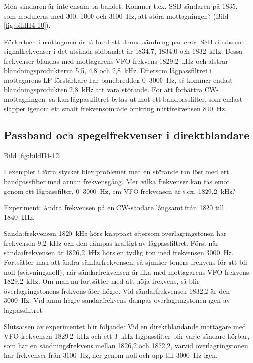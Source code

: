 Men sändaren är inte ensam på bandet. Kommer t.ex. SSB-sändaren på
1835, som moduleras med 300, 1000 och 3000~Hz, att störa mottagningen?
(Bild \ref{fig:bildII4-10}).

Förkretsen i mottagaren är så bred att denna sändning
passerar. SSB-sändarens signalfrekvenser i det utsända sidbandet är
1834,7, 1834,0 och 1832~kHz. Dessa frekvenser blandas med mottagarens
VFO-frekvens 1829,2~kHz och alstrar blandningsprodukterna 5,5, 4,8 och
2,8~kHz. Eftersom lågpassfiltret i mottagarens LF-förstärkare har
bandbredden 0--3000~Hz, så kommer endast blandningsprodukten 2,8~kHz
att vara störande. För att förbättra CW-mottagningen, så kan
lågpassfiltret bytas ut mot ett bandpassfilter, som endast släpper
igenom ett smalt frekvensområde omkring mittfrekvensen 800~Hz.

\subsection{Passband och spegelfrekvenser i direktblandare}

Bild \ref{fig:bildII4-12}

I exemplet i förra stycket blev problemet med en störande ton löst med
ett bandpassfilter med annan frekvensgång.  Men vilka frekvenser kan
tas emot genom ett lågpassfilter, 0--3000~Hz, om VFO-frekvensen är
t.ex. 1829,2~kHz?


Experiment: Ändra frekvensen på en CW-sändare långsamt från 1820 till
1840~kHz.

Sändarfrekvensen 1820~kHz hörs knappast eftersom överlagringstonen har
frekvensen 9,2~kHz och den dämpas kraftigt av lågpassfiltret. Först
när sändarfrekvensen är 1826,2~kHz hörs en tydlig ton med frekvensen
3000~Hz. Fortsätter man att ändra sändarfrekvensen, så sjunker tonens
frekvens för att bli noll (svävningsnoll), när sändarfrekvensen är
lika med mottagarens VFO-frekvens 1829,2~kHz. Om man nu fortsätter med
att höja frekvens, så blir överlagringstonens frekvens åter högre. Vid
sändarfrekvensen 1832,2 är den 3000~Hz. Vid ännu högre sändarfrekvens
dämpas överlagringstonen igen av lågpassfiltret

Slutsatsen av experimentet blir följande: Vid en direktblandande
mottagare med VFO-frekvensen 1829,2~kHz och ett 3~kHz lågpassfilter
blir varje sändare hörbar, som har en sändningsfrekvens mellan 1826,2
och 1832,2, varvid överlagringstonen har frekvenser från 3000~Hz, ner
genom noll och upp till 3000~Hz igen.

